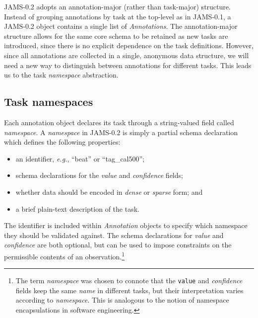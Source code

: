 \documentclass{article}
\begin{document}
JAMS-0.2 adopts an an\-notation-major (rather than task-major) structure.
Instead of grouping annotations by task at the top-level as in JAMS-0.1, a JAMS-0.2 object contains a single list of \emph{Annotations}.
The annotation-major structure allows for the same core schema to be retained as new tasks are introduced, since there is no explicit dependence on the task definitions.
However, since all annotations are collected in a single, anonymous data structure, we will need a new way to distinguish between annotations for different tasks.
This leads us to the task \emph{namespace} abstraction.


\subsection{Task namespaces}\label{sec:schema:namespace}
Each annotation object declares its task through a string-valued field called \emph{namespace}.
A \emph{namespace} in JAMS-0.2 is simply a partial schema declaration which defines the following properties:
\begin{itemize}
    \setlength\itemsep{0em}
    \item an identifier, \emph{e.g.}, ``beat'' or ``tag\_cal500'';
    \item schema declarations for the \emph{value} and \emph{confidence} fields;
    \item whether data should be encoded in \emph{dense} or \emph{sparse} form; and
    \item a brief plain-text description of the task.
\end{itemize}
The identifier is included within \emph{Annotation} objects to specify which namespace they should be validated against.
The schema declarations for \emph{value} and \emph{confidence} are both optional, but can be used to impose constraints on the permissible
contents of an observation.\footnote{The term \emph{namespace} was chosen to connote that
the \texttt{value} and \emph{confidence} fields keep the same \emph{name} in different
tasks, but their interpretation varies according to \emph{namespace}.  This is analogous
to the notion of namespace encapsulations in software engineering.}

\end{document}
